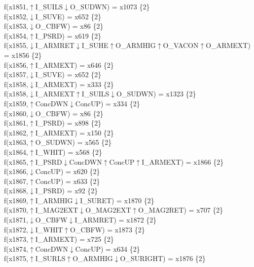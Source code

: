 f(x1851,$\uparrow$I\_SUILS$\downarrow$O\_SUDWN) = x1073 \{2\} \\  
f(x1852,$\downarrow$I\_SUVE) = x652 \{2\} \\  
f(x1853,$\downarrow$O\_CBFW) = x86 \{2\} \\  
f(x1854,$\uparrow$I\_PSRD) = x619 \{2\} \\  
f(x1855,$\downarrow$I\_ARMRET$\downarrow$I\_SUHE$\uparrow$O\_ARMHIG$\uparrow$O\_VACON$\uparrow$O\_ARMEXT) = x1856 \{2\} \\  
f(x1856,$\uparrow$I\_ARMEXT) = x646 \{2\} \\  
f(x1857,$\downarrow$I\_SUVE) = x652 \{2\} \\  
f(x1858,$\downarrow$I\_ARMEXT) = x333 \{2\} \\  
f(x1858,$\downarrow$I\_ARMEXT$\uparrow$I\_SUILS$\downarrow$O\_SUDWN) = x1323 \{2\} \\  
f(x1859,$\uparrow$ConcDWN$\downarrow$ConcUP) = x334 \{2\} \\  
f(x1860,$\downarrow$O\_CBFW) = x86 \{2\} \\  
f(x1861,$\uparrow$I\_PSRD) = x898 \{2\} \\  
f(x1862,$\uparrow$I\_ARMEXT) = x150 \{2\} \\  
f(x1863,$\uparrow$O\_SUDWN) = x565 \{2\} \\  
f(x1864,$\uparrow$I\_WHIT) = x568 \{2\} \\  
f(x1865,$\uparrow$I\_PSRD$\downarrow$ConcDWN$\uparrow$ConcUP$\uparrow$I\_ARMEXT) = x1866 \{2\} \\  
f(x1866,$\downarrow$ConcUP) = x620 \{2\} \\  
f(x1867,$\uparrow$ConcUP) = x633 \{2\} \\  
f(x1868,$\downarrow$I\_PSRD) = x92 \{2\} \\  
f(x1869,$\uparrow$I\_ARMHIG$\downarrow$I\_SURET) = x1870 \{2\} \\  
f(x1870,$\uparrow$I\_MAG2EXT$\downarrow$O\_MAG2EXT$\uparrow$O\_MAG2RET) = x707 \{2\} \\  
f(x1871,$\downarrow$O\_CBFW$\downarrow$I\_ARMRET) = x1872 \{2\} \\  
f(x1872,$\downarrow$I\_WHIT$\uparrow$O\_CBFW) = x1873 \{2\} \\  
f(x1873,$\uparrow$I\_ARMEXT) = x725 \{2\} \\  
f(x1874,$\uparrow$ConcDWN$\downarrow$ConcUP) = x634 \{2\} \\  
f(x1875,$\uparrow$I\_SURLS$\uparrow$O\_ARMHIG$\downarrow$O\_SURIGHT) = x1876 \{2\} \\  
